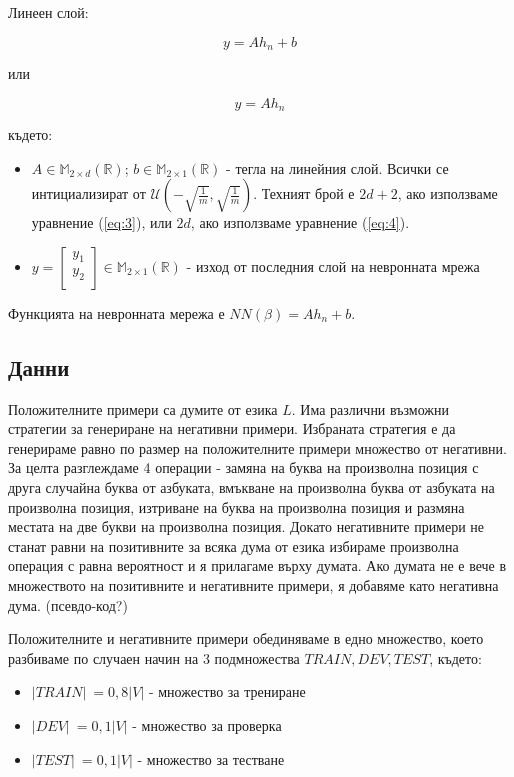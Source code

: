 \documentclass[a4paper,12pt]{article}
\begin{document}
Линеен слой:

\begin{equation} \label{eq:3}
y = A h_n + b
\end{equation}

или

\begin{equation} \label{eq:4}
y = A h_n
\end{equation}

където:

\begin{itemize}
\item $ A \in \mathbb{M}_{2 \times d} (\mathbb{R})$; $b \in \mathbb{M}_{2 \times 1} (\mathbb{R}) $ - тегла на линейния слой. Всички се интициализират от $\mathcal{U}(-\sqrt{\frac{1}{m}}, \sqrt{\frac{1}{m}})$. Техният брой е $2d + 2$, ако използваме уравнение (\ref{eq:3}), или $2d$, ако използваме уравнение (\ref{eq:4}).
\item $y = \begin{bmatrix}
  y_1 \\ 
  y_2 \\ 
\end{bmatrix} \in \mathbb{M}_{2 \times 1} (\mathbb{R})$ - изход от последния слой на невронната мрежа
\end{itemize}

Функцията на невронната мережа е $NN(\beta) = Ah_n + b$.

\subsection{Данни}

Положителните примери са думите от езика $L$. Има различни възможни стратегии за генериране на негативни примери. Избраната стратегия е да генерираме равно по размер на положителните примери множество от негативни. За целта разглеждаме 4 операции - замяна на буква на произволна позиция с друга случайна буква от азбуката, вмъкване на произволна буква от азбуката на произволна позиция, изтриване на буква на произволна позиция и размяна местата на две букви на произволна позиция. Докато негативните примери не станат равни на позитивните за всяка дума от езика избираме произволна операция с равна вероятност и я прилагаме върху думата. Ако думата не е вече в множеството на позитивните и негативните примери, я добавяме като негативна дума. (псевдо-код?)

Положителните и негативните примери обединяваме в едно множество, което разбиваме по случаен начин на 3 подмножества $TRAIN, DEV, TEST$, където:
\begin{itemize}
 \item $|TRAIN|\:= 0,8|V|$ - множество за трениране
 \item $|DEV|\:= 0,1|V|$ - множество за проверка
 \item $|TEST|\:= 0,1|V|$ - множество за тестване
\end{itemize}
\end{document}
